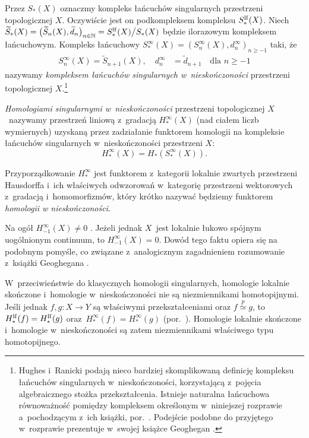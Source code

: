 Przez $S_*(X)$ oznaczmy kompleks łańcuchów singularnych przestrzeni topologicznej $X$. Oczywiście jest on podkompleksem kompleksu $S_*^{\mathrm{lf}}(X)$. Niech $\widetilde{S}_*(X)=\bigl(\widetilde{S}_n(X),\widetilde{d}_n\bigr)_{n\in\mathbb{N}}=S_*^{\mathrm{lf}}(X)\big/S_*(X)$ będzie ilorazowym kompleksem łańcuchowym. 
Kompleks łańcuchowy $S_*^\infty(X)=\left(S^\infty_n(X),d^\infty_n\right)_{n\geq -1}$ taki, że \begin{align*}S_n^\infty(X)=\widetilde{S}_{n+1}(X),\quad d^\infty_n&=\widetilde{d}_{n+1}\quad \text{dla } n\geq-1\end{align*} nazywamy \textit{kompleksem łańcuchów singularnych w~nieskończoności} przestrzeni topologicznej $X$.\footnote{Hughes i~Ranicki \cite[Definition 3.8]{Hughes96} podają nieco bardziej skomplikowaną definicję kompleksu łańcuchów singularnych w~nieskończoności, korzystającą z~pojęcia algebraicznego stożka przekształcenia. Istnieje naturalna łańcuchowa równoważność pomiędzy kompleksem określonym w~niniejszej rozprawie a~pochodzącym z~ich książki, por.~\cite[Lemma 3.7]{Hughes96}. Podejście podobne do przyjętego w~rozprawie prezentuje w~swojej książce Geoghegan \cite{Geoghegan08}.}

\textit{Homologiami singularnymi w~nieskończoności} przestrzeni topologicznej $X$~nazywamy przestrzeń liniową z~gradacją $H_*^\infty(X)$ (nad ciałem liczb wymiernych) uzyskaną przez zadziałanie funktorem homologii na kompleksie łańcuchów singularnych w~nieskończoności przestrzeni $X$: \[H_*^{\infty}(X)=H_*(S_*^\infty(X)).\]

Przyporządkowanie $H_*^\infty$ jest funktorem z~kategorii lokalnie zwartych przestrzeni Hausdorffa i~ich właściwych odwzorowań w~kategorię przestrzeni wektorowych z~gradacją i~homomorfizmów, który krótko nazywać będziemy funktorem \textit{homologii w nieskończoności}.


Na ogół $H^\infty_{-1}(X)\not=0$ \cite[Example 3.18]{Hughes96}. Jeżeli jednak $X$~jest lokalnie łukowo spójnym uogólnionym continuum, to $H_{-1}^\infty(X)=0$. Dowód tego faktu opiera się na podobnym pomyśle, co związane z~analogicznym zagadnieniem rozumowanie z~książki Geoghegana \cite[Proposition 11.4.2]{Geoghegan08}.

W~przeciwieństwie do klasycznych homologii singularnych, homologie lokalnie skończone i~homologie w~nieskończoności nie są niezmiennikami homotopijnymi. Jeśli jednak $f,g\colon X\to Y$ są właściwymi przekształceniami oraz $f\overset{p}{\simeq} g$, to $H_*^{\mathrm{lf}}(f)=H_*^{\mathrm{lf}}(g)$ oraz~$H_*^\infty(f)=H_*^\infty(g)$ (por.~\cite{Hughes96}). Homologie lokalnie skończone i~homologie w~nieskończoności są zatem niezmiennikami właściwego typu homotopijnego.

